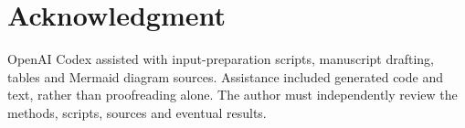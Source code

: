 \documentclass[conference]{IEEEtran}
\begin{document}
\section*{Acknowledgment}
OpenAI Codex assisted with input-preparation scripts, manuscript drafting, tables and Mermaid diagram sources. Assistance included generated code and text, rather than proofreading alone. The author must independently review the methods, scripts, sources and eventual results.



\end{document}
